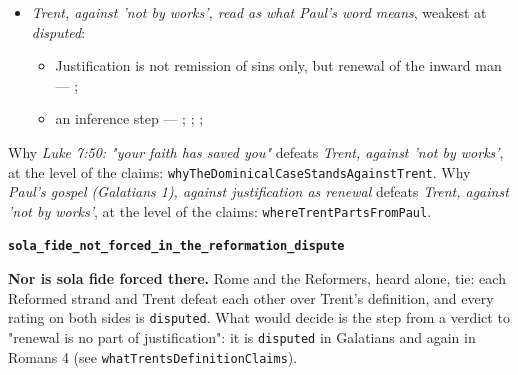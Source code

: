 \documentclass[11pt]{article}
\begin{document}
\begin{itemize}
\begin{itemize}
\item an inference step --- \cite[ad loc. Gal 1:6]{moo-galatians-2013}; \cite[XI.1]{westminster-confession-1647}
\item an inference step --- \cite[XI.1]{westminster-confession-1647}; \cite[III.xi.2]{calvin-institutes-1960}; \cite{morris-apostolic-preaching-1965}
\end{itemize}
\item \emph{Trent, against 'not by works', read as what Paul's word means}, weakest at \emph{disputed}:
\begin{itemize}
\item Justification is not remission of sins only, but renewal of the inward man --- \cite[Trent, Session VI (1547), Decree on Justification, ch. 7]{tanner-decrees-1990}; \cite[Trent, Session VI (1547), canon 11]{tanner-decrees-1990}
\item an inference step --- \cite[Trent, Session VI (1547), Decree on Justification, ch. 8]{tanner-decrees-1990}; \cite[Trent, Session VI (1547), Decree on Justification, ch. 7]{tanner-decrees-1990}; \cite[On the Spirit and the Letter, ch. 45 (26.45)]{npnf1-05-1887}; \cite{mcgrath-iustitia-dei-2005}
\end{itemize}
\end{itemize}
\noindent Why \emph{Luke 7:50: "your faith has saved you"} defeats \emph{Trent, against 'not by works'}, at the level of the claims: \texttt{why\allowbreak{}The\allowbreak{}Dominical\allowbreak{}Case\allowbreak{}Stands\allowbreak{}Against\allowbreak{}Trent}.
\noindent Why \emph{Paul's gospel (Galatians 1), against justification as renewal} defeats \emph{Trent, against 'not by works'}, at the level of the claims: \texttt{where\allowbreak{}Trent\allowbreak{}Parts\allowbreak{}From\allowbreak{}Paul}.
\par\medskip\noindent\textbf{\texttt{sola\_\allowbreak{}fide\_\allowbreak{}not\_\allowbreak{}forced\_\allowbreak{}in\_\allowbreak{}the\_\allowbreak{}reformation\_\allowbreak{}dispute}}\par\nobreak\noindent
\textbf{Nor is sola fide forced there.} Rome and the Reformers, heard alone, tie: each Reformed strand and Trent defeat each other over Trent's definition, and every rating on both sides is \texttt{disputed}. What would decide is the step from a verdict to "renewal is no part of justification": it is \texttt{disputed} in Galatians and again in Romans 4 (see \texttt{what\allowbreak{}Trents\allowbreak{}Definition\allowbreak{}Claims}).
\end{document}
